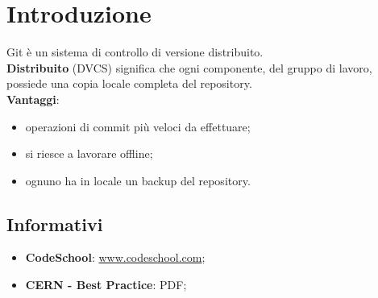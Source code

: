 %


\section{Introduzione} %
\label{sec:introduzione}
Git è un sistema di controllo di versione distribuito. \\
\textbf{Distribuito} (DVCS) significa che ogni componente, del gruppo di lavoro, possiede una copia locale completa del repository. \\

\noindent
\textbf{Vantaggi}:
	\begin{itemize}
		\item operazioni di commit più veloci da effettuare;
		\item si riesce a lavorare offline;
		\item ognuno ha in locale un backup del repository.
	\end{itemize}
	
\begin{comment}
	\begin{figure}[htbp]
		\centering
		\texttt{[image: images/proc\_assegnazione\_task.pdf]}
		\caption{Diagramma di attività - procedura d'assegnazione di un task}
		\label{fig:procedura_assegnazione_task}
	\end{figure}
\end{comment}


	\subsection{Informativi} %
	\label{sub:informativi}
		\begin{itemize}
			\item \textbf{CodeSchool}: \url{www.codeschool.com};
			\item \textbf{CERN - Best Practice}: PDF;
		\end{itemize}

